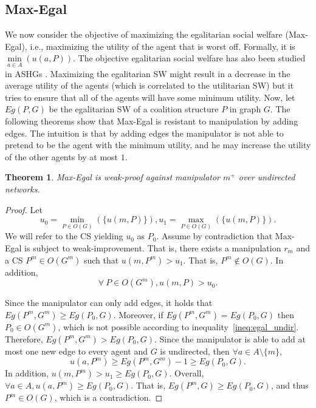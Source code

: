 \documentclass{article}
\newtheorem{theorem}{Theorem}
\begin{document}
\subsection{Max-Egal}
\label{Sec:egalitarian}
We now consider the objective of maximizing the egalitarian social welfare (Max-Egal), i.e., maximizing the utility of the agent that is worst off. Formally, it is $\underset{a\in A}{\min}(u(a,P))$.
The objective egalitarian social welfare has also been studied in ASHGs \cite{peters2016graphical,aziz2013computing}.
Maximizing the egalitarian SW might result in a decrease in the average utility of the agents  (which is correlated to the utilitarian SW) but it tries to ensure that all of the agents will have some minimum utility. Now, let $Eg(P,G)$ be the egalitarian SW of a coalition structure $P$ in graph $G$. The following theorems show that Max-Egal is resistant to manipulation by adding edges. The intuition is that by adding edges the manipulator is not able to pretend to be the agent with the minimum utility, and he may increase the utility of the other agents by at most $1$. 
\begin{theorem}
\label{thrm:egal_undir_add}
Max-Egal is weak-proof against manipulator $m^+$ over undirected networks.
\end{theorem}
\begin{proof}
Let 
\[
u_0=\underset{P\in O(G)}{\min}(\{u(m,P)\}),
u_1=\underset{P\in O(G)}{\max}(\{u(m,P)\}).
\]
We will refer to the CS yielding $u_0$ as $P_0$.
Assume by contradiction that Max-Egal is subject to weak-improvement.
That is, there exists a manipulation $r_{m}$ and a CS $P^m\in O(G^{m})$ such that $u(m,P^m) > u_1$. That is, $P^m\notin O(G)$. In addition, 
\begin{equation} \label{ineq:egal_undir}
\forall \  P \in O(G^m), u(m,P) > u_0.
\end{equation}

Since the manipulator can only add edges, it holds that $Eg(P^{m},G^m)\geq Eg(P_0,G)$. Moreover, if $Eg(P^{m},G^m)=Eg(P_0,G)$ then $P_{0}\in O(G^{m})$, which is not possible according to  inequality~\ref{ineq:egal_undir}. Therefore, $Eg(P^{m},G^m)>Eg(P_0,G)$. Since the manipulator is able to add at most one new edge to every agent and $G$ is undirected, then $\forall a \in A \setminus \{m\}$, \[
u(a,P^{m})  \geq Eg(P^{m},G^m) - 1 \geq Eg(P_0,G).
\]
In addition, $u(m,P^{m})>u_1\geq Eg(P_0,G)$. 
Overall, $\forall a \in A, u(a,P^{m}) \geq Eg(P_0,G)$. That is, $Eg(P^{m},G) \geq Eg(P_0,G)$, and thus $P^m\in O(G)$, which is a contradiction. 
\end{proof}
\end{document}
